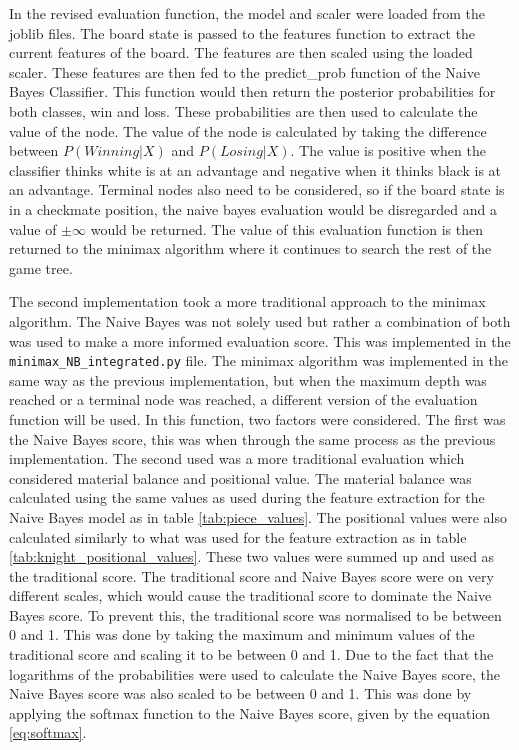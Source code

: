 In the revised evaluation function, the model and scaler were loaded from the joblib files. The board state is passed to the features function to extract the current features of the board. The features are then scaled using the loaded scaler. These features are then fed to the predict\_prob function of the Naive Bayes Classifier. This function would then return the posterior probabilities for both classes, win and loss. These probabilities are then used to calculate the value of the node. The value of the node is calculated by taking the difference between $P(Winning | X)$ and $P(Losing | X)$. The value is positive when the classifier thinks white is at an advantage and negative when it thinks black is at an advantage. Terminal nodes also need to be considered, so if the board state is in a checkmate position, the naive bayes evaluation would be disregarded and a value of $\pm \infty$ would be returned. The value of this evaluation function is then returned to the minimax algorithm where it continues to search the rest of the game tree. 

The second implementation took a more traditional approach to the minimax algorithm. The Naive Bayes was not solely used but rather a combination of both was used to make a more informed evaluation score. This was implemented in the \texttt{minimax\_NB\_integrated.py} file. The minimax algorithm was implemented in the same way as the previous implementation, but when the maximum depth was reached or a terminal node was reached, a different version of the evaluation function will be used. In this function, two factors were considered. The first was the Naive Bayes score, this was when through the same process as the previous implementation. The second used was a more traditional evaluation which considered material balance and positional value. The material balance was calculated using the same values as used during the feature extraction for the Naive Bayes model as in table \ref{tab:piece_values}. The positional values were also calculated similarly to what was used for the feature extraction as in table \ref{tab:knight_positional_values}. These two values were summed up and used as the traditional score. The traditional score and Naive Bayes score were on very different scales, which would cause the traditional score to dominate the Naive Bayes score. To prevent this, the traditional score was normalised to be between 0 and 1. This was done by taking the maximum and minimum values of the traditional score and scaling it to be between 0 and 1. Due to the fact that the logarithms of the probabilities were used to calculate the Naive Bayes score, the Naive Bayes score was also scaled to be between 0 and 1. This was done by applying the softmax function to the Naive Bayes score, given by the equation \ref{eq:softmax}. 


